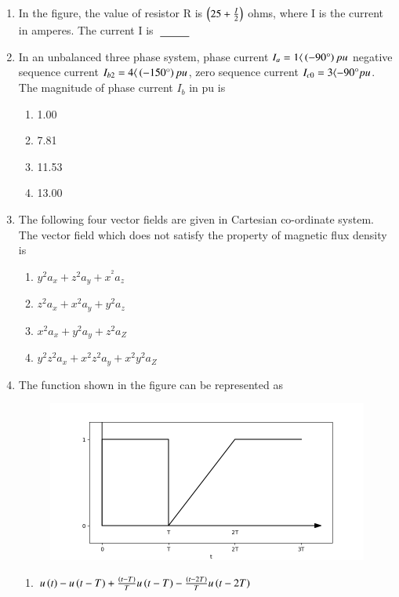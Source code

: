 \documentclass[journal,12pt,onecolumn]{IEEEtran}
\theoremstyle{remark}
\begin{document}
\begin{enumerate}
\item In the figure, the value of resistor R is $\left(25 + \frac{I}{2}\right)$ ohms, where I is the current in amperes. The current I is $\makebox[3cm][l]{\underline{\hspace{1cm}}}$ 
\begin{figure}[!ht]
\centering
\resizebox{0.4\textwidth}{!}{
	
}%
\end{figure}
\item In an unbalanced three phase system, phase current $I_{a} = 1{\langle}\left(-90\degree\right)pu$ negative sequence current $I_{b2} = 4{\langle}\left(-150{\degree}\right)pu$, zero sequence current $I_{c0} = 3\langle{-90\degree}pu$. The magnitude of phase current $I_b$ in pu is
\begin{enumerate}
    \item 1.00
    \item 7.81
    \item 11.53
    \item 13.00
\end{enumerate}
\item The following four vector fields are given in Cartesian co-ordinate system. The vector field which does not satisfy the property of magnetic flux density is
\begin{enumerate}
    \item $y^{2}a_{x} + z^{2}a_{y} + x^^2a_{z}$
    \item $z^{2}a_{x} + x^{2}a_{y} + y^{2}a_{z}$
    \item $x^{2}a_{x} + y^{2}a_{y} + z^{2}a_{Z}$
    \item $y^{2}z^{2}a_{x} + x^{2}z^{2}a_{y} + x^{2}y^{2}a_{Z}$
\end{enumerate}
\item The function shown in the figure can be represented as\\
\begin{figure}[h!]
\centering
\includegraphics[width=0.4\linewidth]{figs/graph.png}
\label{fig:11011}
\end{figure}
\begin{enumerate}
    \item $u\left(t\right) - u\left(t-T\right) + \frac{\left(t-T\right)}{T}u\left(t-T\right) - \frac{\left(t-2T\right)}{T}u\left(t-2T\right)$

\end{enumerate}
\end{enumerate}
\end{document}
